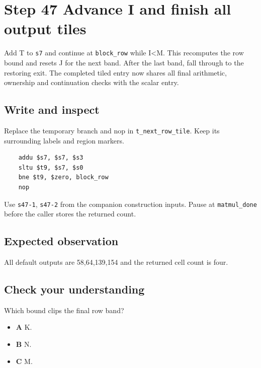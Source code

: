 \section{Step 47 Advance I and finish all output tiles}\label{matmul-s47}

Add T to \texttt{s7} and continue at \texttt{block\_row} while I<M. This recomputes the row bound and resets J for the next band. After the last band, fall through to the restoring exit. The completed tiled entry now shares all final arithmetic, ownership and continuation checks with the scalar entry.

\subsection{Write and inspect}
Replace the temporary branch and nop in \texttt{t\_next\_row\_tile}. Keep its surrounding labels and region markers.

\begin{verbatim}
    addu $s7, $s7, $s3
    sltu $t9, $s7, $s0
    bne $t9, $zero, block_row
    nop
\end{verbatim}
Use \texttt{s47-1}, \texttt{s47-2} from the companion construction inputs. Pause at \texttt{matmul\_done} before the caller stores the returned count.

\subsection{Expected observation}
All default outputs are 58,64,139,154 and the returned cell count is four.

\subsection{Check your understanding}
Which bound clips the final row band?

\begin{itemize}
  \item \textbf{A} K.
  \item \textbf{B} N.
  \item \textbf{C} M.
\end{itemize}
